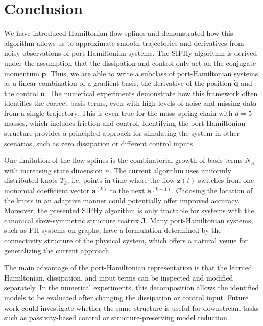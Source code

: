 \documentclass[11pt, a4paper]{article}
\theoremstyle{plain}
\theoremstyle{definition}
\theoremstyle{remark}
\begin{document}
\section{Conclusion}

We have introduced Hamiltonian flow splines and demonstrated how this algorithm allows us to approximate smooth trajectories and derivatives from noisy observations of port-Hamiltonian systems. The SIPHy algorithm is derived under the assumption that the dissipation and control only act on the conjugate momentum $\mathbf{p}$. Thus, we are able to write a subclass of port-Hamiltonian systems as a linear combination of a gradient basis, the derivative of the position $\dot{\mathbf{q}}$ and the control $\mathbf{u}$. The numerical experiments demonstrate how this framework often identifies the correct basis terms, even with high levels of noise and missing data from a single trajectory. This is even true for the mass--spring chain with $d=5$ masses, which includes friction and control. Identifying the port-Hamiltonian structure provides a principled approach for simulating the system in other scenarios, such as zero dissipation or different control inputs.

One limitation of the flow splines is the combinatorial growth of basis terms $N_\Lambda$ with increasing state dimension $n$. The current algorithm uses uniformly distributed knots $T_k$, i.e. points in time where the flow $\mathbf{z}(t)$ switches from one monomial coefficient vector $\mathbf{a}^{(k)}$ to the next $\mathbf{a}^{(k+1)}$. Choosing the location of the knots in an adaptive manner could potentially offer improved accuracy. Moreover, the presented SIPHy algorithm is only tractable for systems with the canonical skew-symmetric structure matrix $\mathbf{J}$. Many port-Hamiltonian systems, such as PH-systems on graphs, have a formulation determined by the connectivity structure of the physical system, which offers a natural venue for generalizing the current approach. 

The main advantage of the port-Hamiltonian representation is that the learned Hamiltonian, dissipation, and input terms can be inspected and modified separately. In the numerical experiments, this decomposition allows the identified models to be evaluated after changing the dissipation or control input. Future work could investigate whether the same structure is useful for downstream tasks such as passivity-based control or structure-preserving model reduction.
\end{document}
